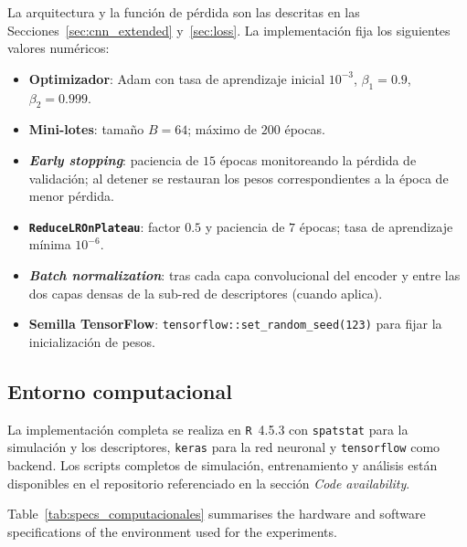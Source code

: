 \documentclass[a4paper,fleqn]{cas-sc}
\numberwithin{equation}{section}
\begin{document}
La arquitectura y la funci\'on de p\'erdida son las descritas en las
Secciones~\ref{sec:cnn_extended} y~\ref{sec:loss}. La implementaci\'on
fija los siguientes valores num\'ericos:
\begin{itemize}
    \item \textbf{Optimizador}: Adam con tasa de aprendizaje inicial
    $10^{-3}$, $\beta_1=0.9$, $\beta_2=0.999$.
    \item \textbf{Mini-lotes}: tama\~no $B=64$; m\'aximo de $200$
    \'epocas.
    \item \textbf{\textit{Early stopping}}: paciencia de $15$ \'epocas
    monitoreando la p\'erdida de validaci\'on; al detener se restauran
    los pesos correspondientes a la \'epoca de menor p\'erdida.
    \item \textbf{\texttt{ReduceLROnPlateau}}: factor $0.5$ y paciencia
    de $7$ \'epocas; tasa de aprendizaje m\'inima $10^{-6}$.
    \item \textbf{\textit{Batch normalization}}: tras cada capa
    convolucional del encoder y entre las dos capas densas de la
    sub-red de descriptores (cuando aplica).
    \item \textbf{Semilla TensorFlow}: \texttt{tensorflow::set\_random\_seed(123)}
    para fijar la inicializaci\'on de pesos.
\end{itemize}

\subsection{Entorno computacional}
\label{app:env}

La implementaci\'on completa se realiza en \texttt{R}~4.5.3 \citep{R}
con \texttt{spatstat} \citep{spatstat} para la simulaci\'on y los
descriptores, \texttt{keras} \citep{keras, keras_book} para la red
neuronal y \texttt{tensorflow} como backend. Los scripts completos de
simulaci\'on, entrenamiento y an\'alisis est\'an disponibles en el
repositorio referenciado en la secci\'on \emph{Code availability}.

Table~\ref{tab:specs_computacionales} summarises the hardware and
software specifications of the environment used for the experiments.
\end{document}
